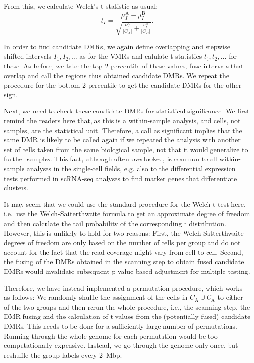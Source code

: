 \documentclass[10pt]{article}
\begin{document}
From this, we calculate Welch's t statistic as usual:
\[ t_I = \frac{\mu^\text{A}_I - \mu^\text{B}_I}{\sqrt{\frac{v^\text{A}_I}{|C_A|} + \frac{v^\text{B}_I}{|C_B|}}}.\]

In order to find candidate DMRs, we again define overlapping and stepwise shifted intervals $I_1, I_2, \dots$ as for the VMRs and calulate t statistics $t_1, t_2, \dots$ for these.
As before, we take the top 2-percentile of these values, fuse intervals that overlap and call the regions thus obtained candidate DMRs.
We repeat the procedure for the bottom 2-percentile to get the candidate DMRs for the other sign.

Next, we need to check these candidate DMRs for statistical significance.
We first remind the readers here that, as this is a within-sample analysis, and cells, not samples, are the statistical unit.
Therefore, a call as significant implies that the same DMR is likely to be called again if we repeated the analysis with another set of cells taken from the same biological sample, not that it would generalize to further samples.
This fact, although often overlooked, is common to all within-sample analyses in the single-cell fields, e.g. also to the differential expression tests performed in scRNA-seq analyses to find marker genes that differentiate clusters.

It may seem that we could use the standard procedure for the Welch t-test here, i.e.\ use the Welch-Satterthwaite formula to get an approximate degree of freedom and then calculate the tail probability of the corresponding t distribution.
However, this is unlikely to hold for two reasons:
First, the Welch-Satterthwaite degrees of freedom are only based on the number of cells per group and do not account for the fact that the read coverage might vary from cell to cell.
Second, the fusing of the DMRs obtained in the scanning step to obtain fused candidate DMRs would invalidate subsequent p-value based adjustment for multiple testing.

Therefore, we have instead implemented a permutation procedure, which works as follows:
We randomly shuffle the assignment of the cells in $C_\text{A}\cup C_\text{A}$ to either of the two groups and then rerun the whole procedure, i.e., the scanning step, the DMR fusing and the calculation of t values from the (potentially fused) candidate DMRs.
This needs to be done for a sufficiently large number of permutations.
Running through the whole genome for each permutation would be too computationally expensive.
Instead, we go through the genome only once, but reshuffle the group labels every 2~Mbp.
\end{document}
